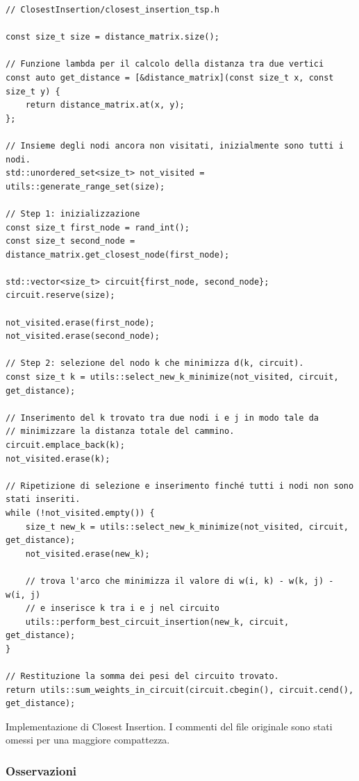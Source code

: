 \begin{listing}[!ht]
\begin{verbatim}
// ClosestInsertion/closest_insertion_tsp.h

const size_t size = distance_matrix.size();

// Funzione lambda per il calcolo della distanza tra due vertici
const auto get_distance = [&distance_matrix](const size_t x, const size_t y) {
    return distance_matrix.at(x, y);
};

// Insieme degli nodi ancora non visitati, inizialmente sono tutti i nodi.
std::unordered_set<size_t> not_visited = utils::generate_range_set(size);

// Step 1: inizializzazione
const size_t first_node = rand_int();
const size_t second_node = distance_matrix.get_closest_node(first_node);

std::vector<size_t> circuit{first_node, second_node};
circuit.reserve(size);

not_visited.erase(first_node);
not_visited.erase(second_node);

// Step 2: selezione del nodo k che minimizza d(k, circuit).
const size_t k = utils::select_new_k_minimize(not_visited, circuit, get_distance);

// Inserimento del k trovato tra due nodi i e j in modo tale da
// minimizzare la distanza totale del cammino.
circuit.emplace_back(k);
not_visited.erase(k);

// Ripetizione di selezione e inserimento finché tutti i nodi non sono stati inseriti.
while (!not_visited.empty()) {
    size_t new_k = utils::select_new_k_minimize(not_visited, circuit, get_distance);
    not_visited.erase(new_k);
    
    // trova l'arco che minimizza il valore di w(i, k) - w(k, j) - w(i, j)
    // e inserisce k tra i e j nel circuito
    utils::perform_best_circuit_insertion(new_k, circuit, get_distance);
}

// Restituzione la somma dei pesi del circuito trovato.
return utils::sum_weights_in_circuit(circuit.cbegin(), circuit.cend(), get_distance);
\end{verbatim}
\caption{Implementazione di Closest Insertion. I commenti del file originale sono stati omessi per una maggiore compattezza.}
\label{listing:closest-insertion}
\end{listing}

\subsubsection{Osservazioni}

